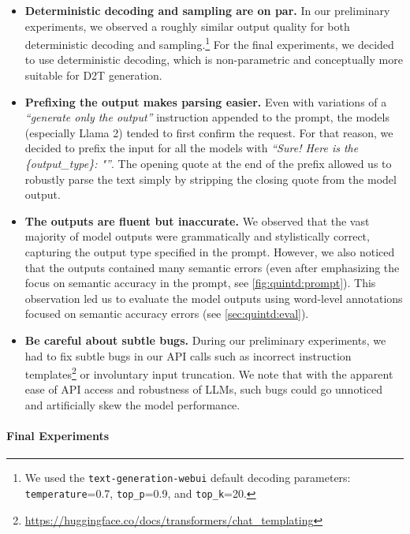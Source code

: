 \begin{itemize}
    \item\textbf{Deterministic decoding and sampling are on par.} In our preliminary experiments, we observed a roughly similar output quality for both deterministic decoding and sampling.\footnote{We used the \texttt{text-generation-webui} default decoding parameters: \texttt{temperature}=0.7, \texttt{top\_p}=0.9, and \texttt{top\_k}=20.} For the final experiments, we decided to use deterministic decoding, which is non-parametric and conceptually more suitable for D2T generation.

    \item\textbf{Prefixing the output makes parsing easier.} Even with variations of a \textit{``generate only the output''} instruction appended to the prompt, the models (especially Llama 2) tended to first confirm the request. For that reason, we decided to prefix the input for all the models with \textit{``Sure! Here is the \{output\_type\}: "''}. The opening quote at the end of the prefix allowed us to robustly parse the text simply by stripping the closing quote from the model output.

    \item\textbf{The outputs are fluent but inaccurate.} We observed that the vast majority of model outputs were grammatically and stylistically correct, capturing the output type specified in the prompt. However, we also noticed that the outputs contained many semantic errors (even after emphasizing the focus on semantic accuracy in the prompt, see \autoref{fig:quintd:prompt}). This observation led us to evaluate the model outputs using word-level annotations focused on semantic accuracy errors (see \autoref{sec:quintd:eval}).


    \item\textbf{Be careful about subtle bugs.} During our preliminary experiments, we had to fix subtle bugs in our API calls such as incorrect instruction templates\footnote{\url{https://huggingface.co/docs/transformers/chat_templating}} or involuntary input truncation. We note that with the apparent ease of API access and robustness of LLMs, such bugs could go unnoticed and artificially skew the model performance.

\end{itemize}



\paragraph{Final Experiments}
\label{sec:quintd:basic}

